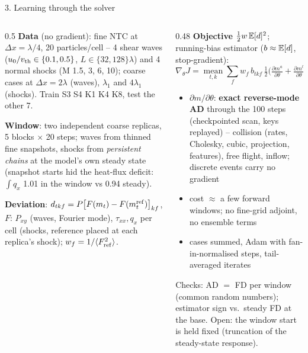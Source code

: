 \documentclass[10pt,aspectratio=169]{beamer}
\begin{document}
\begin{frame}{3. Learning through the solver}
\begin{columns}[T]
\begin{column}{0.5\textwidth}
\small
\textbf{Data} (no gradient): fine NTC at $\Delta x=\lambda/4$, 20 particles/cell --
4 shear waves ($u_0/v_{\rm th}\in\{0.1,0.5\}$, $L\in\{32,128\}\lambda$) and 4 normal shocks
(M 1.5, 3, 6, 10); coarse cases at $\Delta x=2\lambda$ (waves), $\lambda_1$ and $4\lambda_1$
(shocks). Train S3 S4 K1 K4 K8, test the other 7.

\medskip
\textbf{Window}: two independent coarse replicas, 5 blocks $\times$ 20 steps;
waves from thinned fine snapshots, shocks from \emph{persistent chains} at the model's own
steady state (snapshot starts hid the heat-flux deficit: $\int q_x$ 1.01 in the window vs 0.94
steady).

\medskip
\textbf{Deviation}: $d_{tkf}=P\big[F(m_t)-F(m^{\rm ref}_t)\big]_{kf}$, \; $F$: $P_{xy}$ (waves,
Fourier mode), $\tau_{xx},q_x$ per cell (shocks, reference placed at each replica's shock);
$w_f=1/\langle F_{\rm ref}^2\rangle$.
\end{column}
\begin{column}{0.48\textwidth}
\small
\textbf{Objective} $\tfrac12 w\,\mathbb{E}[d]^2$; running-bias estimator ($b\approx\mathbb{E}[d]$, stop-gradient):
\[
\nabla_\theta J=\operatorname*{mean}_{t,k}\sum_f w_f\, b_{tkf}\,\tfrac12
\Big(\tfrac{\partial m^a}{\partial\theta}+\tfrac{\partial m^b}{\partial\theta}\Big)_{tkf}
\]
\vspace{-4pt}
\begin{itemize}\setlength{\itemsep}{2pt}
\item $\partial m/\partial\theta$: \textbf{exact reverse-mode AD} through the 100 steps
  (checkpointed scan, keys replayed) -- collision (rates, Cholesky, cubic, projection,
  features), free flight, inflow; discrete events carry no gradient
\item cost $\approx$ a few forward windows; no fine-grid adjoint, no ensemble terms
\item cases summed, Adam with fan-in-normalised steps, tail-averaged iterates
\end{itemize}
\footnotesize
Checks: AD $=$ FD per window (common random numbers); estimator sign vs.\ steady FD at the base.
Open: the window start is held fixed (truncation of the steady-state response).
\end{column}
\end{columns}
\end{frame}
\end{document}
